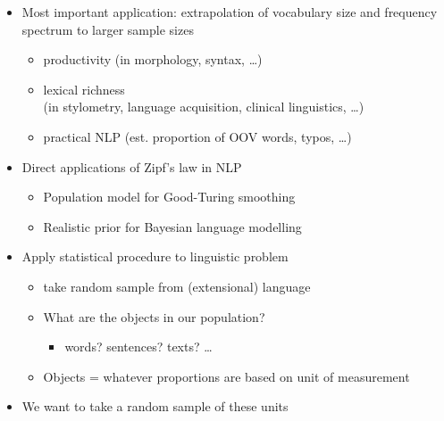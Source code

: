 \documentclass[a4paper,landscape,headrule,footrule,dvips]{foils}
\begin{document}
\begin{CJK}{UTF8}{min}
\begin{itemize}
  \item Most important application: extrapolation of vocabulary
size and frequency spectrum to larger sample sizes
\begin{itemize}
  \item productivity (in morphology, syntax, \ldots)
  \item lexical richness
\\ (in stylometry, language acquisition, clinical linguistics, \ldots)
\item practical NLP (est. proportion of OOV words, typos, \ldots)
\end{itemize}
\item Direct applications of Zipf’s law in NLP
\begin{itemize}
  \item Population model for Good-Turing smoothing
  \item Realistic prior for Bayesian language modelling
  \end{itemize}
\end{itemize}


\begin{itemize}
\item Apply statistical procedure to linguistic problem
  \begin{itemize}
  \item take random sample from (extensional) language
  \item What are the objects in our population?
    \begin{itemize}
    \item words? sentences? texts? …
    \end{itemize}
  \item Objects = whatever proportions are based on
    \into unit of measurement
  \end{itemize}
\item We want to take a random sample of these units
\end{itemize}

 


\end{CJK}
\end{document}
